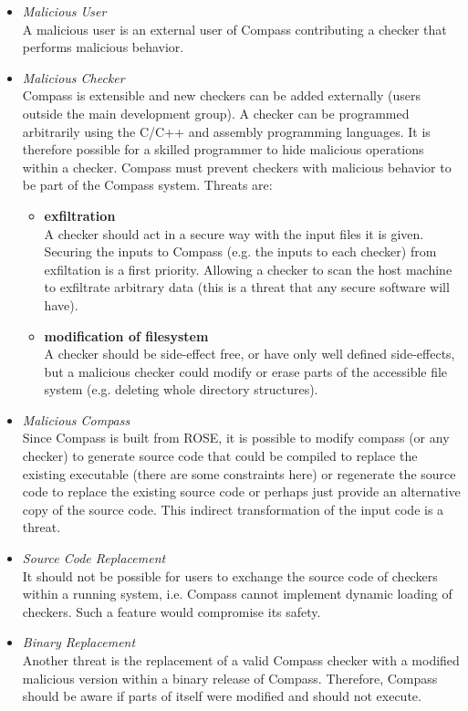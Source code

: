 \begin{itemize}
\item \emph{Malicious User} \\ 
  A malicious user is an external user of Compass contributing a checker that performs malicious behavior.
\item \emph{Malicious Checker} \\ 
  Compass is extensible and new checkers can be added externally (users outside the main development group).
  A checker can be programmed arbitrarily using the C/C++ and assembly programming languages. 
  It is therefore possible for a skilled programmer to hide malicious operations within a
  checker.  Compass must prevent checkers with malicious behavior to be part of the
  Compass system. Threats are:
   \begin{itemize}
      \item {\bf exfiltration} \\
         A checker should act in a secure way with the input files it is given.
         Securing the inputs to Compass (e.g. the inputs to each checker) from 
         exfiltation is a first priority. Allowing a checker to scan the host 
         machine to exfiltrate arbitrary data (this is a threat that any secure
         software will have).
      \item {\bf modification of filesystem} \\
         A checker should be side-effect free, or have only well defined side-effects, 
         but a malicious checker could modify or erase parts of the accessible file 
         system (e.g. deleting whole directory structures).
   \end{itemize}

\item \emph{Malicious Compass} \\
    Since Compass is built from ROSE, it is possible to modify compass (or any checker) 
    to generate source code that could be compiled to replace the existing executable
    (there are some constraints here) or regenerate the source code to replace the 
    existing source code or perhaps just provide an alternative copy of the source code.
    This indirect transformation of the input code is a threat.

\item \emph{Source Code Replacement} \\ It should not be possible for users to exchange the
    source code of checkers within a running system, i.e. Compass cannot implement dynamic
    loading of checkers. Such a feature would compromise its safety.

\item \emph{Binary Replacement} \\ Another threat is the replacement of a valid Compass
    checker with a modified malicious version within a binary release of Compass.
    Therefore, Compass should be aware if parts of itself were modified and should not
    execute.

\end{itemize} 

